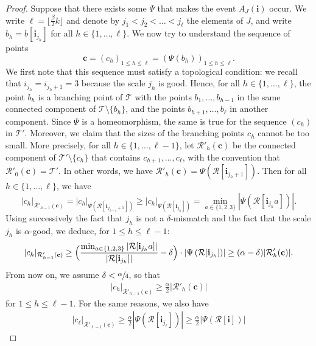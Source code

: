 \documentclass[JEP,XML,SOM,Unicode,NoFloatCountersInSection,published]{cedram}
\let\backslash\setminus
\newcommand{\Rr}{\mathcal{R}}
\newcommand{\ii}{\mathbf{i}}
\theoremstyle{plain}
\theoremstyle{definition}
\begin{document}
\begin{proof}
Suppose that there exists some $\Psi$ that makes the event $A_J(\ii)$ occur.
We write $\ell=\lfloor \frac{\beta}{2}k \rfloor$ and denote by $j_1 < j_2 < \dots < j_{\ell}$ the elements of $J$, and write $b_h=b[\ii_{j_{h}}]$ for all $h\in\{1,\dots,\ell\}$.
We now try to understand the sequence of points
\[ \mathbf{c}=(c_h)_{1 \leq h \leq \ell} = \left( \Psi(b_h) \right)_{1 \leq h \leq \ell}.\]
We first note that this sequence must satisfy a topological condition: we recall that $i_{j_h}=i_{j_h+1}=3$ because the scale $j_h$ is good. Hence, for all $h\in\{1,\dots,\ell\}$, the point $b_h$ is a branching point of $\mathcal{T}$ with the points $b_1, \dots, b_{h-1}$ in the same connected component of $\mathcal{T} \backslash \{b_h\}$, and the points $b_{h+1}, \dots, b_{\ell}$ in another component.
Since $\Psi$ is a homeomorphism, the same is true for the sequence $(c_h)$ in $\mathcal{T}'$. Moreover, we claim that the sizes of the branching points $c_h$ cannot be too small.
More precisely, for all $h\in\{1,\dots,\ell-1\}$, let $\Rr'_h(\mathbf{c})$ be the connected component of $\mathcal{T}' \backslash \{ c_h\}$ that contains $c_{h+1}, \dots, c_{\ell}$, with the convention that $\Rr'_0(\mathbf{c})=\mathcal{T}'$.
In other words, we have $\Rr'_h(\mathbf{c})=\Psi \left( \Rr[\ii_{j_h+1}] \right)$.
Then for all $h\in\{1,\dots,\ell\}$, we have
\[ |c_h|_{\Rr'_{h-1}(\mathbf{c})} = |c_h|_{\Psi \left( \Rr[\ii_{j_{h-1}+1}]
\right)} \geq |c_h|_{\Psi \left( \Rr[\ii_{j_{h}}] \right)} = \min_{a \in \{1,2,3\}} | \Psi( \Rr[\ii_{j_h} a]) |.\]
Using successively the fact that $j_h$ is not a $\delta$-mismatch and the fact that the scale $j_h$ is $\alpha$-good, we deduce, for $1 \leq h \leq \ell-1$:
\begin{equation}\label{eqn_ci_not_too_small}
|c_h|_{\Rr'_{h-1}(\mathbf{c})} \geq \Bigl( \frac{\min_{a \in \{1,2,3\}} \left| \Rr[\ii_{j_h} a] \right| }{\left| \Rr[\ii_{j_h}] \right|} -\delta \Bigr) \cdot \left| \Psi \left( \Rr[\ii_{j_h}] \right) \right| \geq (\alpha-\delta) | \Rr'_h(\mathbf{c}) |.
\end{equation}
From now on, we assume $\delta<\sfrac{\alpha}{4}$, so that
\begin{align*}
|c_h|_{\Rr'_{h-1}(\mathbf{c})} \geq \frac{\alpha}{2} \left| \Rr'_h(\mathbf{c}) \right|
\end{align*}
for $1 \leq h \leq \ell-1$.
For the same reasons, we also have
\begin{align*}
|c_{\ell}|_{\Rr'_{\ell-1}(\mathbf{c})} \geq \frac{\alpha}{2} \left| \Psi \left( \Rr[\ii_{j_{\ell}}]\right) \right| \geq \frac{\alpha}{2} \left| \Psi \left( \Rr[\ii] \right) \right|

\end{align*}
\end{proof}
\end{document}

